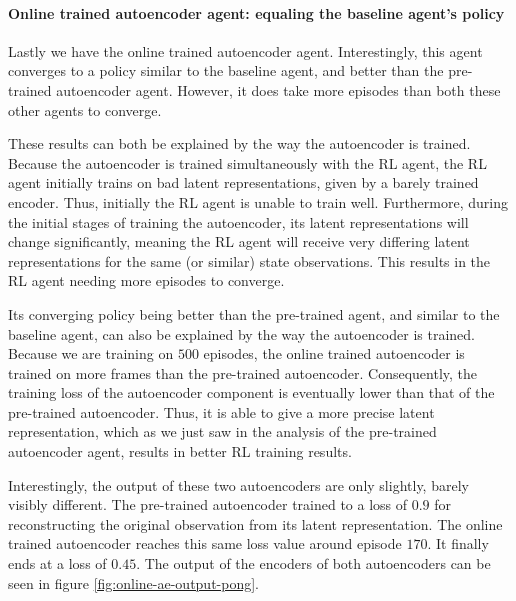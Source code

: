\clearpage
\paragraph{Online trained autoencoder agent: equaling the baseline agent's policy}
Lastly we have the online trained autoencoder agent. Interestingly, this agent converges to a policy similar to the baseline agent, and better than the pre-trained autoencoder agent. However, it does take more episodes than both these other agents to converge.

These results can both be explained by the way the autoencoder is trained. Because the autoencoder is trained simultaneously with the RL agent, the RL agent initially trains on bad latent representations, given by a barely trained encoder. Thus, initially the RL agent is unable to train well. Furthermore, during the initial stages of training the autoencoder, its latent representations will change significantly, meaning the RL agent will receive very differing latent representations for the same (or similar) state observations. This results in the RL agent needing more episodes to converge.

Its converging policy being better than the pre-trained agent, and similar to the baseline agent, can also be explained by the way the autoencoder is trained. Because we are training on $500$ episodes, the online trained autoencoder is trained on more frames than the pre-trained autoencoder. Consequently, the training loss of the autoencoder component is eventually lower than that of the pre-trained autoencoder. Thus, it is able to give a more precise latent representation, which as we just saw in the analysis of the pre-trained autoencoder agent, results in better RL training results.

Interestingly, the output of these two autoencoders are only slightly, barely visibly different. The pre-trained autoencoder trained to a loss of $0.9$ for reconstructing the original observation from its latent representation. The online trained autoencoder reaches this same loss value around episode $170$. It finally ends at a loss of $0.45$. The output of the encoders of both autoencoders can be seen in figure \ref{fig:online-ae-output-pong}.

